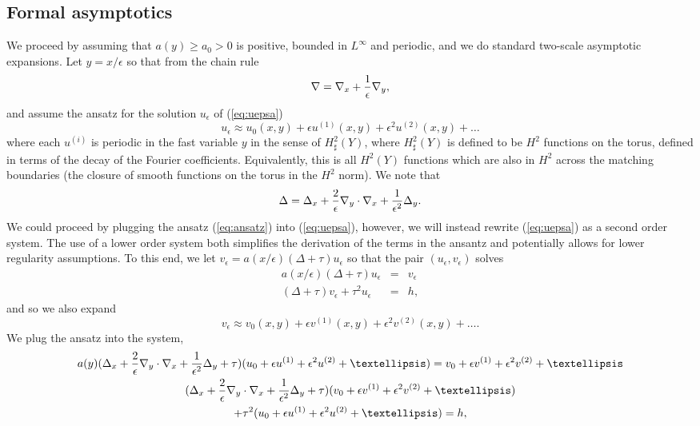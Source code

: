 \documentclass[10pt,a4paper]{amsart}
\begin{document}
\subsection{Formal asymptotics} We proceed by assuming that $a(y)\geq a_0>0$  is positive, bounded in $L^\infty$ and periodic, and we do standard two-scale asymptotic expansions. Let $y=x/\epsilon$ so that from the chain rule 
$$\nabla = \nabla_x +{1\over{\epsilon}} \nabla_y , $$
and assume the ansatz for the solution $u_\epsilon$ of (\ref{eq:uepsa})
\begin{equation} \label{eq:ansatz} u_\epsilon \approx u_0(x,y) + \epsilon u^{(1)} (x,y) +\epsilon^2 u^{(2)}(x,y) +\ldots \end{equation}
where each $u^{(i)}$ is periodic in the fast variable $y$ in the sense of $H^2_\sharp(Y)$, where $H^2_\sharp(Y)$ is defined to be $H^2$ functions on the torus, defined in terms of the decay of the Fourier coefficients. Equivalently, this is all $H^2(Y)$ functions which are also in $H^2$ across the matching boundaries (the closure of smooth functions on the torus in the $H^2$ norm). We note that 
$$ \Delta = \Delta_x + {2\over{\epsilon}} \nabla_y\cdot\nabla_x + {1\over{\epsilon^2}} \Delta_y. $$
We could proceed by plugging the ansatz (\ref{eq:ansatz}) into (\ref{eq:uepsa}), however, we will instead rewrite (\ref{eq:uepsa}) as a second order system. The use of a lower order system both simplifies the derivation of the terms in the ansantz and potentially allows for lower regularity assumptions.  To this end, we let $ v_\epsilon = a(x/\epsilon) (\Delta +\tau )u_\epsilon $ so that the pair $(u_\epsilon, v_\epsilon)$ solves
\begin{eqnarray}\label{eq:uepssystem}  a(x/\epsilon) (\Delta +\tau )u_\epsilon  &=& v_\epsilon  \\ (\Delta +\tau )v_\epsilon  +\tau^2 u_\epsilon &=& h, \nonumber\end{eqnarray}
and so we also expand 
\begin{equation} \label{eq:ansatzv} v_\epsilon \approx v_0(x,y) + \epsilon v^{(1)} (x,y) +\epsilon^2 v^{(2)}(x,y) +\ldots .\end{equation}
We plug the ansatz into the system, 
\begin{multline}  a(y) (\Delta_x + {2\over{\epsilon}} \nabla_y\cdot\nabla_x + {1\over{\epsilon^2}} \Delta_y +\tau ) ( u_0 +\epsilon u^{(1)} +\epsilon^2 u^{(2)} +\ldots ) = v_0 +\epsilon v^{(1)} +\epsilon^2 v^{(2)} +\ldots \\ (\Delta_x + {2\over{\epsilon}} \nabla_y\cdot\nabla_x + {1\over{\epsilon^2}} \Delta_y +\tau ) ( v_0 +\epsilon v^{(1)} +\epsilon^2 v^{(2)} +\ldots ) \\ + \tau^2( u_0 +\epsilon u^{(1)} +\epsilon^2 u^{(2)} +\ldots ) = h ,\end{multline} 
\end{document}

